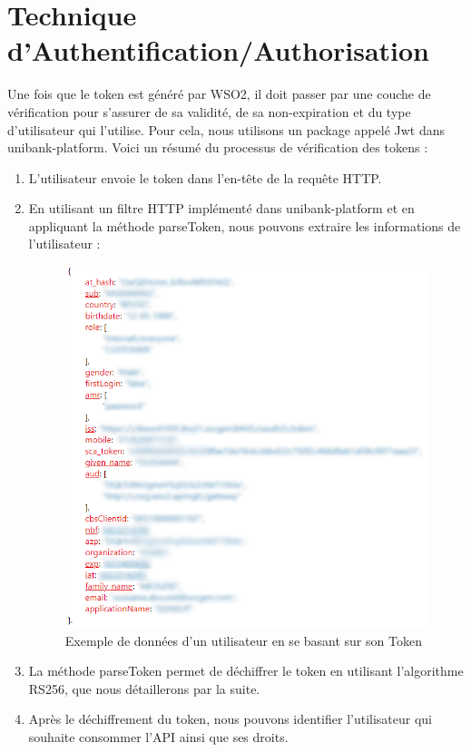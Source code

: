 \section{Technique d'Authentification/Authorisation}
Une fois que le token est généré par WSO2, il doit passer par une couche de vérification pour s'assurer de sa validité, de sa non-expiration et du type d'utilisateur qui l'utilise. Pour cela, nous utilisons un package appelé Jwt dans unibank-platform. Voici un résumé du processus de vérification des tokens :
\begin{enumerate}
    \item L'utilisateur envoie le token dans l'en-tête de la requête HTTP.
    \item En utilisant un filtre HTTP implémenté dans unibank-platform et en appliquant la méthode parseToken, nous pouvons extraire les informations de l'utilisateur :
    
    \begin{figure}[!h]
        \centering %
            \includegraphics[width=16cm]{images/conception/exempleDeDonnees.png}
        \caption{Exemple de données d’un utilisateur en se basant sur son Token}
    \end{figure}
    \newpage

    \item La méthode parseToken permet de déchiffrer le token en utilisant l'algorithme RS256, que nous détaillerons par la suite.
    \item Après le déchiffrement du token, nous pouvons identifier l'utilisateur qui souhaite consommer l'API ainsi que ses droits.\\
\end{enumerate}

